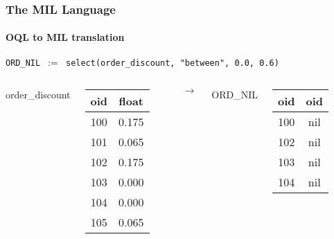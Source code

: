 \documentclass{beamer}
\begin{document}
\begin{frame}
\begin{columns}
  \end{columns}

\end{frame}

\begin{frame}
  \frametitle{The MIL Language}
  \framesubtitle{OQL to MIL translation}

  \begin{block}{}
  {\tt ORD\_NIL $:=$ select(order\_discount, "between", 0.0, 0.6)}
  \end{block}

  \begin{columns}

  \column{1cm}

  order\_discount
  \begin{tabular}{|c|c|}
    \hline
    oid & float \\
    \hline
    100 & 0.175 \\
    101 & 0.065 \\
    102 & 0.175 \\
    103 & 0.000 \\
    104 & 0.000 \\
    105 & 0.065 \\
    \hline
  \end{tabular}

  \column{1cm}

  $\longrightarrow$

  \column{1cm}

  ORD\_NIL
  \begin{tabular}{|c|c|}
    \hline
    oid & oid \\
    \hline
    100 & nil \\
    102 & nil \\
    103 & nil \\
    104 & nil \\
    \hline
  \end{tabular}

  \end{columns}

\end{frame}
\end{document}
